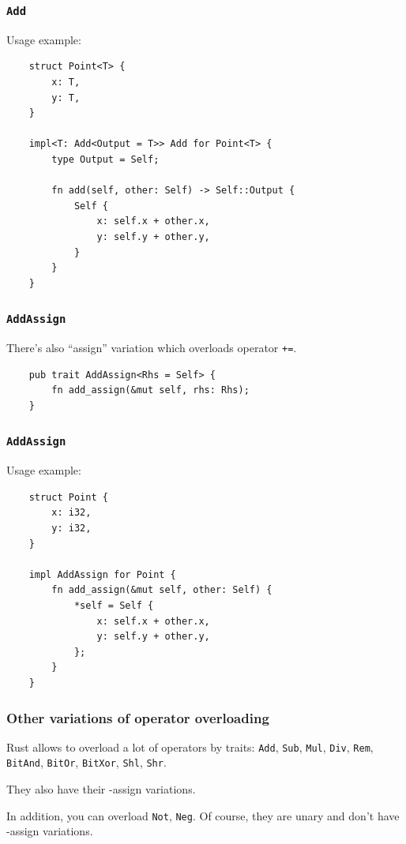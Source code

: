 \documentclass[aspectratio=1610,t]{beamer}
\begin{document}

\begin{frame}[fragile]
\frametitle{\texttt{Add}}
Usage example:

\begin{verbatim}
    struct Point<T> {
        x: T,
        y: T,
    }

    impl<T: Add<Output = T>> Add for Point<T> {
        type Output = Self;

        fn add(self, other: Self) -> Self::Output {
            Self {
                x: self.x + other.x,
                y: self.y + other.y,
            }
        }
    }
\end{verbatim}
\end{frame}


\begin{frame}[fragile]
\frametitle{\texttt{AddAssign}}
There's also ``assign'' variation which overloads operator \texttt{+=}.

\begin{verbatim}
    pub trait AddAssign<Rhs = Self> {
        fn add_assign(&mut self, rhs: Rhs);
    }
\end{verbatim}
\end{frame}


\begin{frame}[fragile]
\frametitle{\texttt{AddAssign}}
Usage example:

\begin{verbatim}
    struct Point {
        x: i32,
        y: i32,
    }

    impl AddAssign for Point {
        fn add_assign(&mut self, other: Self) {
            *self = Self {
                x: self.x + other.x,
                y: self.y + other.y,
            };
        }
    }
\end{verbatim}
\end{frame}


\begin{frame}[fragile]
\frametitle{Other variations of operator overloading}
Rust allows to overload a lot of operators by traits: \texttt{Add}, \texttt{Sub}, \texttt{Mul}, \texttt{Div}, \texttt{Rem}, \texttt{BitAnd}, \texttt{BitOr}, \texttt{BitXor}, \texttt{Shl}, \texttt{Shr}.

They also have their -assign variations.

In addition, you can overload \texttt{Not}, \texttt{Neg}. Of course, they are unary and don't have -assign variations.
\end{frame}
\end{document}
